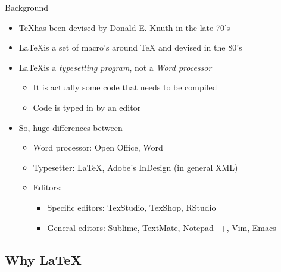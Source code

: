 \documentclass[ignorenonframetext,]{beamer}
\begin{document}
\begin{frame}{Background}

\begin{itemize}
\item
  \TeX has been devised by Donald E. Knuth in the late 70's
\item
  \LaTeX is a set of macro's around TeX and devised in the 80's
\item
  \LaTeX is a \emph{typesetting program}, not a \emph{Word processor}

  \begin{itemize}
  \itemsep1pt\parskip0pt
  \item
    It is actually some code that needs to be compiled
  \item
    Code is typed in by an editor
  \end{itemize}
\item
  So, huge differences between

  \begin{itemize}
  \item
    Word processor: Open Office, Word
  \item
    Typesetter: \LaTeX, Adobe's InDesign (in general XML)
  \item
    Editors:

    \begin{itemize}
    \itemsep1pt\parskip0pt
    \item
      Specific editors: TexStudio, TexShop, RStudio
    \item
      General editors: Sublime, TextMate, Notepad++, Vim, Emacs
    \end{itemize}
  \end{itemize}
\end{itemize}

\end{frame}

\subsection{Why \LaTeX}\label{why}
\end{document}
